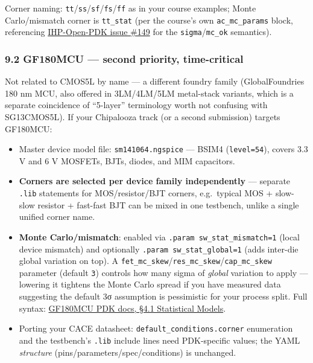 \documentclass[
]{article}
\providecommand{\tightlist}{%
  \setlength{\itemsep}{0pt}\setlength{\parskip}{0pt}}
\begin{document}
Corner naming:
\texttt{tt}/\texttt{ss}/\texttt{sf}/\texttt{fs}/\texttt{ff} as in your
course examples; Monte Carlo/mismatch corner is \texttt{tt\_stat} (per
the course's own \texttt{ac\_mc\_params} block, referencing
\href{https://github.com/IHP-GmbH/IHP-Open-PDK/issues/149}{IHP-Open-PDK
issue \#149} for the \texttt{sigma}/\texttt{mc\_ok} semantics).

\hypertarget{gf180mcu-second-priority-time-critical}{%
\subsubsection{9.2 GF180MCU --- second priority,
time-critical}\label{gf180mcu-second-priority-time-critical}}

Not related to CMOS5L by name --- a different foundry family
(GlobalFoundries 180 nm MCU, also offered in 3LM/4LM/5LM metal-stack
variants, which is a separate coincidence of ``5-layer'' terminology
worth not confusing with SG13CMOS5L). If your Chipalooza track (or a
second submission) targets GF180MCU:

\begin{itemize}
\tightlist
\item
  Master device model file: \texttt{sm141064.ngspice} --- BSIM4
  (\texttt{level=54}), covers 3.3 V and 6 V MOSFETs, BJTs, diodes, and
  MIM capacitors.
\item
  \textbf{Corners are selected per device family independently} ---
  separate \texttt{.lib} statements for MOS/resistor/BJT corners,
  e.g.~typical MOS + slow-slow resistor + fast-fast BJT can be mixed in
  one testbench, unlike a single unified corner name.
\item
  \textbf{Monte Carlo/mismatch}: enabled via
  \texttt{.param\ sw\_stat\_mismatch=1} (local device mismatch) and
  optionally \texttt{.param\ sw\_stat\_global=1} (adds inter-die global
  variation on top). A
  \texttt{fet\_mc\_skew}/\texttt{res\_mc\_skew}/\texttt{cap\_mc\_skew}
  parameter (default \texttt{3}) controls how many sigma of
  \emph{global} variation to apply --- lowering it tightens the Monte
  Carlo spread if you have measured data suggesting the default 3σ
  assumption is pessimistic for your process split. Full syntax:
  \href{https://gf180mcu-pdk.readthedocs.io/en/latest/analog/model_parameters/HV/HV_4_1.html}{GF180MCU
  PDK docs, §4.1 Statistical Models}.
\item
  Porting your CACE datasheet: \texttt{default\_conditions.corner}
  enumeration and the testbench's \texttt{.lib} include lines need
  PDK-specific values; the YAML \emph{structure}
  (pins/parameters/spec/conditions) is unchanged.
\end{itemize}
\end{document}
